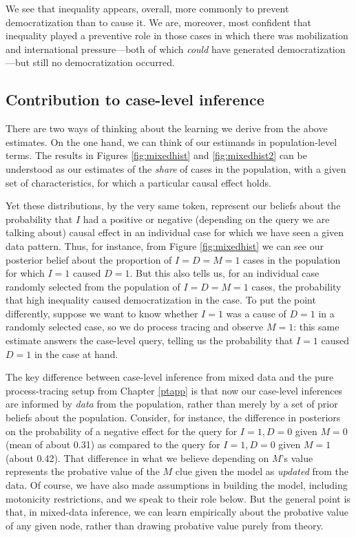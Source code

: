 \documentclass[
  12pt,
]{book}
\begin{document}
We see that inequality appears, overall, more commonly to prevent democratization than to cause it. We are, moreover, most confident that inequality played a preventive role in those cases in which there was mobilization and international pressure---both of which \emph{could} have generated democratization---but still no democratization occurred.

\hypertarget{contribution-to-case-level-inference}{%
\subsection{Contribution to case-level inference}\label{contribution-to-case-level-inference}}

There are two ways of thinking about the learning we derive from the above estimates. On the one hand, we can think of our estimands in population-level terms. The results in Figures \ref{fig:mixedhist} and \ref{fig:mixedhist2} can be understood as our estimates of the \emph{share} of cases in the population, with a given set of characteristics, for which a particular causal effect holds.

Yet these distributions, by the very same token, represent our beliefs about the probability that \(I\) had a positive or negative (depending on the query we are talking about) causal effect in an individual case for which we have seen a given data pattern. Thus, for instance, from Figure \ref{fig:mixedhist} we can see our posterior belief about the proportion of \(I=D=M=1\) cases in the population for which \(I=1\) caused \(D=1\). But this also tells us, for an individual case randomly selected from the population of \(I=D=M=1\) cases, the probability that high inequality caused democratization in the case. To put the point differently, suppose we want to know whether \(I=1\) was a cause of \(D=1\) in a randomly selected case, so we do process tracing and observe \(M=1\): this same estimate answers the case-level query, telling us the probability that \(I=1\) caused \(D=1\) in the case at hand.

The key difference between case-level inference from mixed data and the pure process-tracing setup from Chapter \ref{ptapp} is that now our case-level inferences are informed by \emph{data} from the population, rather than merely by a set of prior beliefs about the population. Consider, for instance, the difference in posteriors on the probability of a negative effect for the query for \(I=1, D=0\) given \(M=0\) (mean of about 0.31) as compared to the query for \(I=1, D=0\) given \(M=1\) (about 0.42). That difference in what we believe depending on \(M\)'s value represents the probative value of the \(M\) clue given the model as \emph{updated} from the data. Of course, we have also made assumptions in building the model, including motonicity restrictions, and we speak to their role below. But the general point is that, in mixed-data inference, we can learn empirically about the probative value of any given node, rather than drawing probative value purely from theory.
\end{document}
